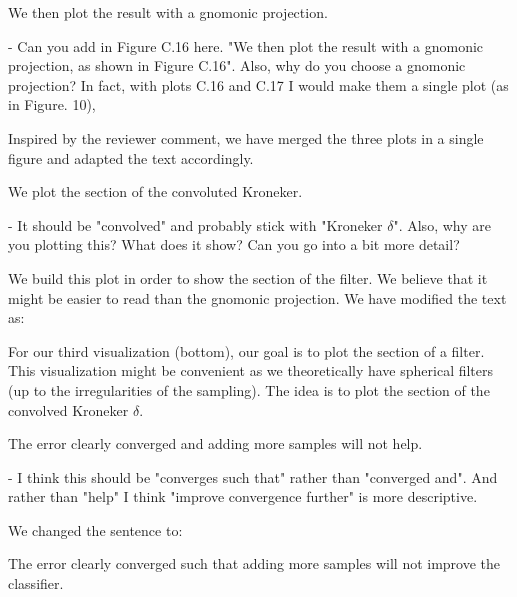 \documentclass[12pt,a4paper]{article}
\newcommand{\1}{\b{1}}              %
\newcommand{\0}{\b{0}}              %
\begin{document}
\begin{mdframed}[style=comment]
We then plot the result with a gnomonic projection.

- Can you add in Figure C.16 here. "We then plot the result with a gnomonic projection, as shown in Figure C.16". Also, why do you choose a gnomonic projection? In fact, with plots C.16 and C.17 I would make them a single plot (as in Figure. 10),
\end{mdframed}
Inspired by the reviewer comment, we have merged the three plots in a single figure and adapted the text accordingly.

\begin{mdframed}[style=comment]
We plot the section of the convoluted Kroneker.

- It should be "convolved" and probably stick with "Kroneker $\delta$". Also, why are you plotting this? What does it show? Can you go into a bit more detail?
\end{mdframed}
We build this plot in order to show the section of the filter. We believe that it might be easier to read than the gnomonic projection. We have modified the text as:
\begin{mdframed}[style=manuscript]
For our third visualization (bottom), our goal is to plot the section of a filter. This visualization might be convenient as we theoretically have spherical filters (up to the irregularities of the sampling). The idea is to plot the section of the convolved Kroneker $\delta$.
\end{mdframed}

\begin{mdframed}[style=comment]
The error clearly converged and adding more samples will not help.

- I think this should be "converges such that" rather than "converged and". And rather than "help" I think "improve convergence further" is more descriptive.
\end{mdframed}
We changed the sentence to:
\begin{mdframed}[style=manuscript]
The error clearly converged such that adding more samples will not improve the classifier.
\end{mdframed}
\end{document}
